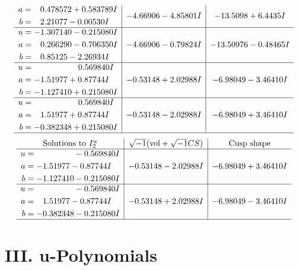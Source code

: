 \documentclass[1p]{elsarticle_modified}
\theoremstyle{definition}
\newcommand{\I}{\sqrt{-1}}
\begin{document}
$$\begin{array}{c|c|c}
\begin{aligned}
a &= \phantom{-}0.478572 + 0.583789 I \\
b &= \phantom{-}2.21077 - 0.00530 I\end{aligned}
 & -4.66906 - 4.85801 I & -13.5098 + 6.4435 I \\ \hline\begin{aligned}
u &= -1.307140 - 0.215080 I \\
a &= \phantom{-}0.266290 - 0.706350 I \\
b &= \phantom{-}0.85125 - 2.26934 I\end{aligned}
 & -4.66906 - 0.79824 I & -13.50976 - 0.48465 I \\ \hline\begin{aligned}
u &= \phantom{-0.000000 -}0.569840 I \\
a &= -1.51977 + 0.87744 I \\
b &= -1.127410 + 0.215080 I\end{aligned}
 & -0.53148 + 2.02988 I & -6.98049 - 3.46410 I \\ \hline\begin{aligned}
u &= \phantom{-0.000000 -}0.569840 I \\
a &= \phantom{-}1.51977 + 0.87744 I \\
b &= -0.382348 + 0.215080 I\end{aligned}
 & -0.53148 - 2.02988 I & -6.98049 + 3.46410 I\\
 \hline 
 \end{array}$$\newpage$$\begin{array}{c|c|c}  
\text{Solutions to }I^u_{2}& \I (\text{vol} + \sqrt{-1}CS) & \text{Cusp shape}\\
 \hline 
\begin{aligned}
u &= \phantom{-0.000000 } -0.569840 I \\
a &= -1.51977 - 0.87744 I \\
b &= -1.127410 - 0.215080 I\end{aligned}
 & -0.53148 - 2.02988 I & -6.98049 + 3.46410 I \\ \hline\begin{aligned}
u &= \phantom{-0.000000 } -0.569840 I \\
a &= \phantom{-}1.51977 - 0.87744 I \\
b &= -0.382348 - 0.215080 I\end{aligned}
 & -0.53148 + 2.02988 I & -6.98049 - 3.46410 I\\
 \hline 
 \end{array}$$\newpage
\newpage\renewcommand{\arraystretch}{1}
\centering \section*{ III. u-Polynomials}
\end{document}
